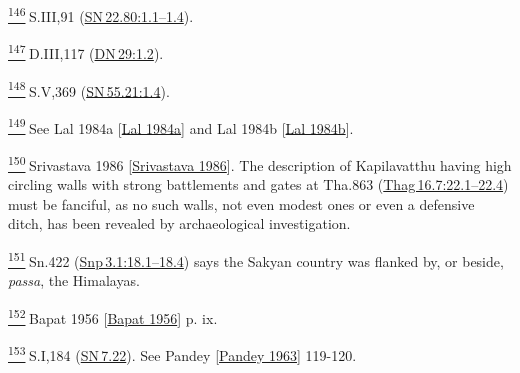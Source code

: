 \label{footprints_split_024.html_fn146}
\hyperref[footprints_split_008.htmlux5cux23fnref146]{\textsuperscript{146}} S.III,91
(\href{https://suttacentral.net/sn22.80/en/sujato\#1.1}{SN\,22.80:1.1--1.4}).

\label{footprints_split_024.html_fn147}
\hyperref[footprints_split_008.htmlux5cux23fnref147]{\textsuperscript{147}} D.III,117
(\href{https://suttacentral.net/dn29/en/sujato\#1.2}{DN\,29:1.2}).

\label{footprints_split_024.html_fn148}
\hyperref[footprints_split_008.htmlux5cux23fnref148]{\textsuperscript{148}} S.V,369
(\href{https://suttacentral.net/sn55.21/en/sujato\#1.4}{SN\,55.21:1.4}).

\label{footprints_split_024.html_fn149}
\hyperref[footprints_split_008.htmlux5cux23fnref149]{\textsuperscript{149}} See
{Lal 1984a
{{[}\hyperref[footprints_split_022.htmlux5cux23Lalux5cux25201984a]{Lal
1984a}{]}}} and {Lal 1984b
{{[}\hyperref[footprints_split_022.htmlux5cux23Lalux5cux25201984b]{Lal
1984b}{]}}}.

\label{footprints_split_024.html_fn150}
\hyperref[footprints_split_008.htmlux5cux23fnref150]{\textsuperscript{150}} {Srivastava
1986
{{[}\hyperref[footprints_split_022.htmlux5cux23Srivastavaux5cux25201986]{Srivastava
1986}{]}}}. The description of Kapilavatthu having high circling walls
with strong battlements and gates at Tha.863
(\href{https://suttacentral.net/thag16.7/en/sujato\#22.1}{Thag\,16.7:22.1--22.4})
must be fanciful, as no such walls, not even modest ones or even a
defensive ditch, has been revealed by archaeological investigation.

\label{footprints_split_024.html_fn151}
\hyperref[footprints_split_008.htmlux5cux23fnref151]{\textsuperscript{151}} Sn.422
(\href{https://suttacentral.net/snp3.1/en/sujato\#18.1}{Snp\,3.1:18.1--18.4})
says the Sakyan country was flanked by, or beside, \emph{passa}, the
Himalayas.

\label{footprints_split_024.html_fn152}
\hyperref[footprints_split_008.htmlux5cux23fnref152]{\textsuperscript{152}} {Bapat
1956
{{[}\hyperref[footprints_split_023.htmlux5cux23Bapatux5cux25201956]{Bapat
1956}{]}}} p. ix.

\label{footprints_split_024.html_fn153}
\hyperref[footprints_split_008.htmlux5cux23fnref153]{\textsuperscript{153}} S.I,184
(\href{https://suttacentral.net/sn7.22/en/sujato}{SN\,7.22}). See
{Pandey
{{[}\hyperref[footprints_split_022.htmlux5cux23Pandeyux5cux25201963]{Pandey
1963}{]}}} 119-120.

